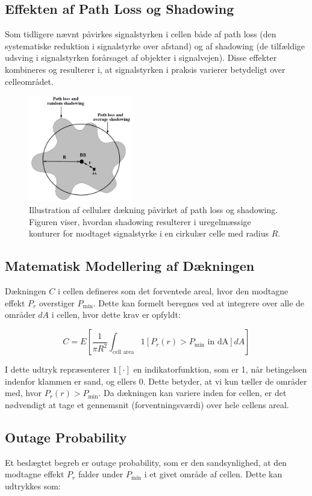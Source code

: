 \documentclass[a4paper,12pt]{book}
\begin{document}
	\subsection{Effekten af Path Loss og Shadowing}
	Som tidligere nævnt påvirkes signalstyrken i cellen både af path loss (den systematiske reduktion i signalstyrke over afstand) og af shadowing (de tilfældige udsving i signalstyrken forårsaget af objekter i signalvejen). Disse effekter kombineres og resulterer i, at signalstyrken i praksis varierer betydeligt over celleområdet.
	
	\begin{figure}[h]
		\centering
		\includegraphics[width=0.4\textwidth]{fig/fig10.png}
		\caption{Illustration af cellulær dækning påvirket af path loss og shadowing. Figuren viser, hvordan shadowing resulterer i uregelmæssige konturer for modtaget signalstyrke i en cirkulær celle med radius \(R\).}
	\end{figure}
	\clearpage
	\subsection{Matematisk Modellering af Dækningen}
	Dækningen \( C \) i cellen defineres som det forventede areal, hvor den modtagne effekt \( P_r \) overstiger \( P_{\text{min}} \). Dette kan formelt beregnes ved at integrere over alle de områder \( dA \) i cellen, hvor dette krav er opfyldt:
	
	\[
	C = E\left[\frac{1}{\pi R^2} \int_{\text{cell area}} 1[P_r(r) > P_{\text{min}} \text{ in dA}] dA\right]
	\]
	
	I dette udtryk repræsenterer \( 1[\cdot] \) en indikatorfunktion, som er 1, når betingelsen indenfor klammen er sand, og ellers 0. Dette betyder, at vi kun tæller de områder med, hvor \( P_r(r) > P_{\text{min}} \). Da dækningen kan variere inden for cellen, er det nødvendigt at tage et gennemsnit (forventningsværdi) over hele cellens areal.
	
	\subsection{Outage Probability}
	Et beslægtet begreb er outage probability, som er den sandsynlighed, at den modtagne effekt \( P_r \) falder under \( P_{\text{min}} \) i et givet område af cellen. Dette kan udtrykkes som:
	
\end{document}
